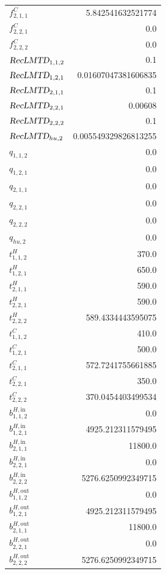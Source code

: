 \documentclass{article}%
\begin{document}
\begin{multicols*}{3}
\begin{supertabular}{lr}
	$f_{2,1,1}^{C}$ & 5.842541632521774 \\%
	$f_{2,2,1}^{C}$ & 0.0 \\%
	$f_{2,2,2}^{C}$ & 0.0 \\%
	$\textsl{RecLMTD}_{1,1,2}$ & 0.1 \\%
	$\textsl{RecLMTD}_{1,2,1}$ & 0.01607047381606835 \\%
	$\textsl{RecLMTD}_{2,1,1}$ & 0.1 \\%
	$\textsl{RecLMTD}_{2,2,1}$ & 0.00608 \\%
	$\textsl{RecLMTD}_{2,2,2}$ & 0.1 \\%
	$\textsl{RecLMTD}_{hu,2}$ & 0.005549329826813255 \\%
	$q_{1,1,2}$ & 0.0 \\%
	$q_{1,2,1}$ & 0.0 \\%
	$q_{2,1,1}$ & 0.0 \\%
	$q_{2,2,1}$ & 0.0 \\%
	$q_{2,2,2}$ & 0.0 \\%
	$q_{hu,2}$ & 0.0 \\%
	$t_{1,1,2}^{H}$ & 370.0 \\%
	$t_{1,2,1}^{H}$ & 650.0 \\%
	$t_{2,1,1}^{H}$ & 590.0 \\%
	$t_{2,2,1}^{H}$ & 590.0 \\%
	$t_{2,2,2}^{H}$ & 589.4334443595075 \\%
	$t_{1,1,2}^{C}$ & 410.0 \\%
	$t_{1,2,1}^{C}$ & 500.0 \\%
	$t_{2,1,1}^{C}$ & 572.7241755661885 \\%
	$t_{2,2,1}^{C}$ & 350.0 \\%
	$t_{2,2,2}^{C}$ & 370.0454403499534 \\%
	$b_{1,1,2}^{H,\text{in}}$ & 0.0 \\%
	$b_{1,2,1}^{H,\text{in}}$ & 4925.212311579495 \\%
	$b_{2,1,1}^{H,\text{in}}$ & 11800.0 \\%
	$b_{2,2,1}^{H,\text{in}}$ & 0.0 \\%
	$b_{2,2,2}^{H,\text{in}}$ & 5276.6250992349715 \\%
	$b_{1,1,2}^{H,\text{out}}$ & 0.0 \\%
	$b_{1,2,1}^{H,\text{out}}$ & 4925.212311579495 \\%
	$b_{2,1,1}^{H,\text{out}}$ & 11800.0 \\%
	$b_{2,2,1}^{H,\text{out}}$ & 0.0 \\%
	$b_{2,2,2}^{H,\text{out}}$ & 5276.6250992349715 \\%

\end{supertabular}
\end{multicols*}
\end{document}
